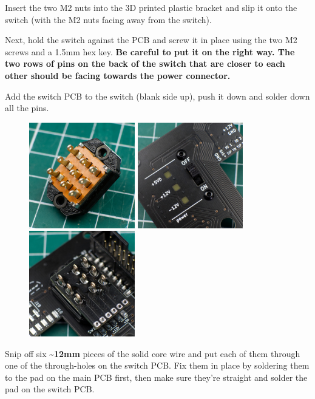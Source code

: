 \documentclass[12pt, a4paper]{article}
\begin{document}
Insert the two M2 nuts into the 3D printed plastic bracket and slip it onto the switch (with
the M2 nuts facing away from the switch).

Next, hold the switch against the PCB and screw it in place using the two M2 screws and a 1.5mm
hex key. \textbf{Be careful to put it on the right way. The two rows of pins on the back of
the switch that are closer to each other should be facing towards the power connector.}

Add the switch PCB to the switch (blank side up), push it down and solder down all the pins.

\begin{figure}[H]
    \centering
    \includegraphics[width=46mm]{images/section_3-1_bracket.jpg}
    \hspace{2mm}
    \includegraphics[width=46mm]{images/section_3-1_screwed.jpg}
    \hspace{2mm}
    \includegraphics[width=46mm]{images/section_3-1_soldered.jpg}
\end{figure}

Snip off six \textbf{\textasciitilde12mm} pieces of the solid core wire and put each of them through
one of the through-holes on the switch PCB. Fix them in place by soldering them to the pad
on the main PCB first, then make sure they're straight and solder the pad on the switch PCB.
\end{document}
